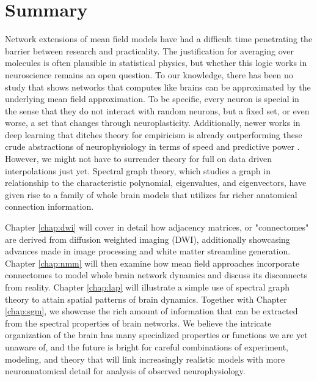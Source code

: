 \section{Summary}
Network extensions of mean field models have had a difficult time penetrating the barrier between research and practicality. The justification for averaging over molecules is often plausible in statistical physics, but whether this logic works in neuroscience remains an open question. To our knowledge, there has been no study that shows networks that computes like brains can be approximated by the underlying mean field approximation. To be specific, every neuron is special in the sense that they do not interact with random neurons, but a fixed set, or even worse, a set that changes through neuroplasticity. Additionally, newer works in deep learning that ditches theory for empiricism is already outperforming these crude abstractions of neurophysiology in terms of speed and predictive power \cite{goncalves_training_2020,pervaiz_optimising_2020,parmar_spatiotemporal_2020}.  However, we might not have to surrender theory for full on data driven interpolations just yet. Spectral graph theory, which studies a graph in relationship to the characteristic polynomial, eigenvalues, and eigenvectors, have given rise to a family of whole brain models that utilizes far richer anatomical connection information. 

Chapter \ref{chap:dwi} will cover in detail how adjacency matrices, or "connectomes" are derived from diffusion weighted imaging (DWI), additionally showcasing advances made in image processing and white matter streamline generation. Chapter \ref{chap:nmm} will then examine how mean field approaches incorporate connectomes to model whole brain network dynamics and discuss its disconnects from reality. Chapter \ref{chap:lap} will illustrate a simple use of spectral graph theory to attain spatial patterns of brain dynamics. Together with Chapter \ref{chap:sgm}, we showcase the rich amount of information that can be extracted from the spectral properties of brain networks. We believe the intricate organization of the brain has many specialized properties or functions we are yet unaware of, and the future is bright for careful combinations of experiment, modeling, and theory that will link increasingly realistic models with more neuroanatomical detail for analysis of observed neurophysiology. 